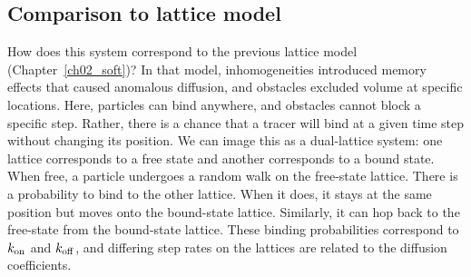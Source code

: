 \subsection{Comparison to lattice model}

How does this system correspond to the previous lattice model
(Chapter~\ref{ch02_soft})?  In that model, inhomogeneities introduced memory
effects that caused anomalous diffusion, and obstacles excluded volume at
specific locations. Here, particles can bind anywhere, and obstacles cannot
block a specific step.  Rather, there is a chance that a tracer will bind at a
given time step without changing its position.  We can image this as a
dual-lattice system: one lattice corresponds to a free state and another
corresponds to a bound state.  When free, a particle undergoes a random walk on
the free-state lattice.  There is a probability to bind to the other lattice.
When it does, it stays at the same position but moves onto the bound-state
lattice.  Similarly, it can hop back to the free-state from the bound-state
lattice.  These binding probabilities correspond to $k_{\rm on}$ and $k_{\rm off}$, and
differing step rates on the lattices are related to the diffusion coefficients.
